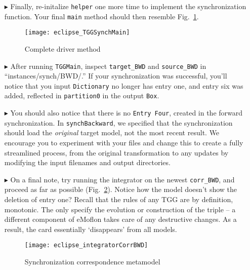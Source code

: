 \begin{itemize}
\item[$\blacktriangleright$] Finally, re-initalize \texttt{helper} one more time to implement the synchronization function. Your final \texttt{main} method
should then resemble Fig.~\ref{eclipse:TGGSynchMain}.

\begin{figure}[htbp]
\begin{center}
  \texttt{[image: eclipse\_TGGSynchMain]}
  \caption{Complete driver method}
  \label{eclipse:TGGSynchMain}
\end{center}
\end{figure}

\item[$\blacktriangleright$] After running \texttt{TGGMain}, inspect \texttt{target\_BWD} and \texttt{source\_BWD} in ``instances/synch/BWD/.'' If your
synchronization was successful, you'll notice that you input \texttt{Dictionary} no longer has entry one, and entry six was added, reflected in
\texttt{partition0} in the output \texttt{Box}. 

\item[$\blacktriangleright$] You should also notice that there is no \texttt{Entry Four}, created in the forward synchronization. In \texttt{synchBackward}, we
specified that the synchronization should load the \emph{original} target model, not the most recent result. We encourage you to experiment with your files and
change this to create a fully streamlined process, from the original transformation to any updates by modifying the input filenames and output
directories.

\newpage

\item[$\blacktriangleright$] On a final note, try running the integrator on the newest \texttt{corr\_BWD}, and proceed as far as possible
(Fig.~\ref{eclipse:synchBwdIntegrator}). Notice how the model doesn't show the deletion of entry one? Recall that the rules of any TGG are by definition,
monotonic. The only specify the evolution or construction of the triple -- a different component of eMoflon takes care of any destructive changes. As a result,
the card essentially `disappears' from all models.

\begin{figure}[htbp]
\begin{center}
  \texttt{[image: eclipse\_integratorCorrBWD]}
  \caption{Synchronization correspondence metamodel}
  \label{eclipse:synchBwdIntegrator}
\end{center}
\end{figure}

\end{itemize}
